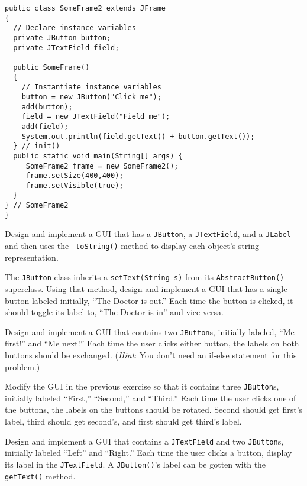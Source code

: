 \begin{EXRtwo}
\begin{jjjlisting}
\begin{lstlisting}
public class SomeFrame2 extends JFrame
{
  // Declare instance variables
  private JButton button;
  private JTextField field;

  public SomeFrame()
  { 
    // Instantiate instance variables
    button = new JButton("Click me");
    add(button);
    field = new JTextField("Field me");
    add(field);
    System.out.println(field.getText() + button.getText());
  } // init()
  public static void main(String[] args) {
     SomeFrame2 frame = new SomeFrame2();
     frame.setSize(400,400);
     frame.setVisible(true);
  }
} // SomeFrame2
}
\end{lstlisting}
\end{jjjlisting}
\item  Design and implement a GUI that has a {\tt JButton}, a 
{\tt JTextField}, and a {\tt JLabel} and then uses the {\tt
toString()} method to display each object's string representation.

\item  The {\tt JButton} class inherits a {\tt setText(String s)} 
from its {\tt AbstractButton()} superclass. Using that method, design
and implement a GUI that has a single button labeled initially, ``The
Doctor is out.''  Each time the button is clicked, it should toggle
its label to, ``The Doctor is in'' and vice versa.

\item  Design and implement a GUI that contains
two {\tt JButton}s, initially labeled, ``Me first!'' and ``Me next!''
Each time the user clicks either button, the labels on both buttons
should be exchanged.  ({\it Hint}: You don't need an if-else statement
for this problem.)

\item  Modify the GUI in the previous exercise so that it contains
three {\tt JButton}s, initially labeled ``First,'' ``Second,'' and
``Third.'' Each time the user clicks one of the buttons, the labels
on the buttons should be rotated.  Second should get first's label,
third should get second's, and first should get third's label.

\item  Design and implement a GUI that contains a
{\tt JTextField} and two {\tt JButton}s, initially labeled ``Left''
and ``Right.'' Each time the user clicks a button, display its
label in the {\tt JTextField}. A {\tt JButton()}'s label can be gotten
with the {\tt getText()} method.


\end{EXRtwo}
